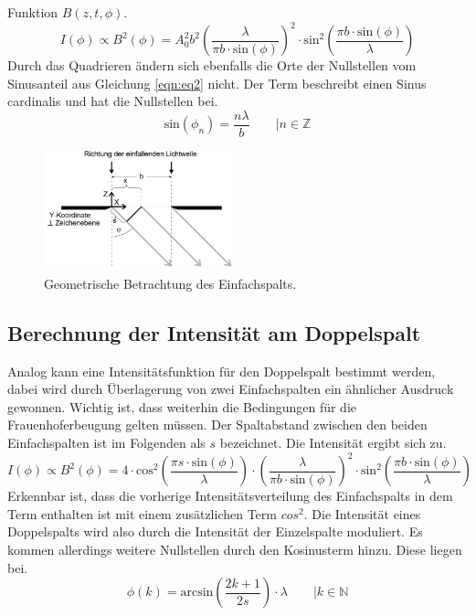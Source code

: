 Funktion $  B(z, t, \phi)$.
\begin{equation}
    \label{eqn:eq3}
I(\phi) \propto B^{2}(\phi) = A_{0}^{2} b^{2} \left( \frac{\lambda}{\pi b \cdot \text{sin}(\phi)}\right)^{2} \cdot \text{sin}^{2}\left(\frac{\pi b \cdot \text{sin}(\phi)}{\lambda}\right)
\end{equation}
Durch das Quadrieren ändern sich ebenfalls die Orte der Nullstellen vom Sinusanteil aus Gleichung \eqref{eqn:eq2} nicht. Der Term beschreibt einen Sinus cardinalis und hat die Nullstellen bei.
\begin{equation*}
\text{sin}(\phi_{n}) = \frac{n \lambda}{b} \quad \quad \bigl| n \in \mathbb{Z}
\end{equation*}
\begin{figure}
    \centering
    \includegraphics[width=0.5\textwidth]{bilder/2.png}
    \caption{Geometrische Betrachtung des Einfachspalts. \cite{skript}} 
    \label{fig:fig2}
\end{figure}
\subsection{Berechnung der Intensität am Doppelspalt}
Analog kann eine Intensitätsfunktion für den Doppelspalt bestimmt werden, dabei wird durch Überlagerung von zwei Einfachspalten ein ähnlicher Ausdruck gewonnen.
Wichtig ist, dass weiterhin die Bedingungen für die Frauenhoferbeugung gelten müssen. Der Spaltabstand zwischen den beiden Einfachspalten ist im Folgenden als $s$ bezeichnet.
Die Intensität ergibt sich zu.
\begin{equation}
    I(\phi) \propto B^{2}(\phi) = 4 \cdot \text{cos}^{2}\left( \frac{\pi s \cdot \text{sin}(\phi)}{\lambda}\right) \cdot \left( \frac{\lambda}{\pi b \cdot \text{sin}(\phi)}\right)^{2} \cdot \text{sin}^{2}\left( \frac{\pi b \cdot \text{sin}(\phi)}{\lambda}\right)
\end{equation}
Erkennbar ist, dass die vorherige Intensitätsverteilung des Einfachspalts in dem Term enthalten ist mit einem zusätzlichen Term $cos^{2}$. Die Intensität eines Doppelspalts wird also durch die Intensität
der Einzelspalte moduliert.
Es kommen allerdings weitere Nullstellen durch den Kosinusterm hinzu. Diese liegen bei.
\begin{equation}
\phi(k)= \text{arcsin}\left(\frac{2k + 1}{2s}\right)\cdot \lambda \quad \quad \bigl| k \in \mathbb{N}
\end{equation}

